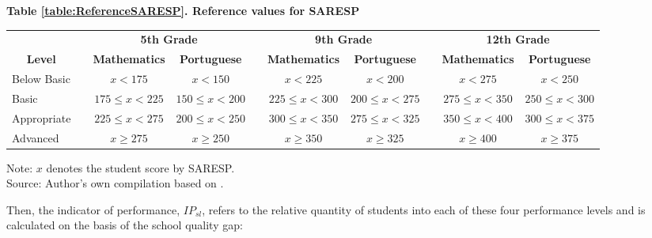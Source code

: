 \documentclass[a4paper, 12pt]{article}
\begin{document}
\begin{table}[H]
  \centering
            \label{table:ReferenceSARESP}                        \centering            \textbf{Table \ref{table:ReferenceSARESP}. Reference values for SARESP} \vspace{2pt} \\ 
  \begin{adjustbox}{width=1\textwidth}
    \begin{tabular}{lrcccccccc}
    \toprule
     &       & \multicolumn{2}{c}{\textbf{5th Grade}} &       & \multicolumn{2}{c}{\textbf{9th Grade}} &       & \multicolumn{2}{c}{\textbf{12th Grade}} \\
\cmidrule{3-4}\cmidrule{6-7}\cmidrule{9-10}    \multicolumn{1}{c}{\textbf{Level}} &       & \textbf{Mathematics} & \textbf{Portuguese} &       & \textbf{Mathematics} & \textbf{Portuguese} &       & \textbf{Mathematics} & \textbf{Portuguese} \\
    \midrule
    \midrule
    Below Basic &       & $x < 175$ & $x < 150$ &       & $x < 225$ & $x < 200$ &       & $x < 275$ & $x < 250$ \\
    Basic &       & $175 \leq x < 225$ & $150 \leq x < 200$ &       & $225 \leq x < 300$ & $200 \leq x < 275$ &       & $275 \leq x < 350$ & $250 \leq x < 300$ \\
    Appropriate &       & $225 \leq x < 275$ & $200 \leq x < 250$ &       & $300 \leq x < 350$ & $275 \leq x < 325$ &       & $350 \leq x < 400$ & $300 \leq x < 375$ \\
    Advanced &       & $x \geq 275$ & $x \geq 250$ &       & $x \geq 350$ & $x \geq 325$ &       & $x \geq 400$ & $x \geq 375$ \\
     \bottomrule
      \end{tabular}%
  \label{tab:SARESP}%
\end{adjustbox}
\end{table}%

\vspace{-15pt} \hspace{-20pt}
    \begin{minipage}{1\textwidth} 
{\scriptsize
Note: $x$ denotes the student score by SARESP. \\  Source: Author's own compilation based on \citet{SEESP2018}. \par}
\end{minipage} 
\vspace{5pt}
   

Then, the indicator of performance, $IP_{sl}$, refers to the relative quantity of students into each of these four performance levels and is calculated on the basis of the school quality gap:
\end{document}
